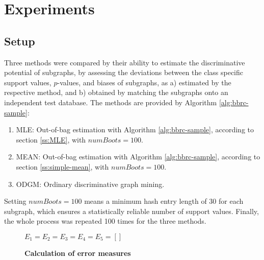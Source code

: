 \documentclass{sig-alternate}
\begin{document}
\section{Experiments}
\label{s:Experiments}

\subsection{Setup} 
\label{ss:Error-estimation} 
Three methods were compared by their ability to estimate the discriminative
potential of subgraphs, by assessing the deviations between the class specific
support values, $p$-values, and biases of subgraphs, as a) estimated by the respective
method, and b) obtained by matching the subgraphs onto an independent test database.
The methods are provided by Algorithm \ref{alg:bbrc-sample}:
\begin{enumerate} 
  \item MLE: Out-of-bag estimation with Algorithm \ref{alg:bbrc-sample}, according
    to section \ref{ss:MLE}, with $numBoots=100$.
  \item MEAN: Out-of-bag estimation with Algorithm \ref{alg:bbrc-sample}, according
    to section \ref{ss:simple-mean}, with $numBoots=100$.
  \item ODGM: Ordinary discriminative graph mining.
\end{enumerate}
Setting $numBoots=100$ means a minimum hash entry length 
of 30 for each subgraph, which ensures a statistically reliable number of support values. 
Finally, the whole process was repeated 100 times for the three methods.

\begin{figure*}[t]
  \begin{minipage}[h]{.59\textwidth}
    \begin{algorithm2e}[H]
      \fontsize{8}{10}
      \selectfont
      $E_1 =  E_2 =  E_3 =  E_4 =  E_5 =  \left[ \right]$\;
      \caption{\textbf{Calculation of error measures}\label{alg:pValEstimate}}
    \end{algorithm2e}
  \end{minipage}
  \begin{minipage}[h]{.39\textwidth}
    
  \end{minipage}
\end{figure*}
\end{document}
